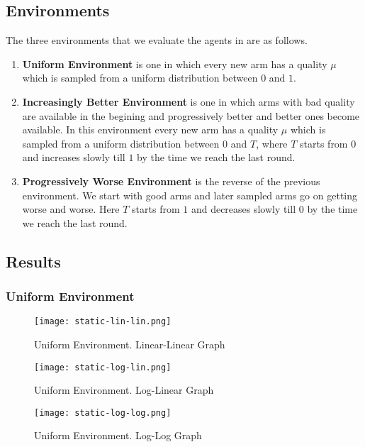 \subsection{Environments}
The three environments that we evaluate the agents in are as follows.

\begin{enumerate}
    \item \textbf{Uniform Environment} is one in which every new arm has a quality $\mu$ which is sampled from a uniform distribution between $0$ and $1$.
    \item \textbf{Increasingly Better Environment} is one in which arms with bad quality are available in the begining and progressively better and better ones become available. In this environment every new arm has a quality $\mu$ which is sampled from a uniform distribution between $0$ and $T$, where $T$ starts from $0$ and increases slowly till $1$ by the time we reach the last round. 
    \item \textbf{Progressively Worse Environment} is the reverse of the previous environment. We start with good arms and later sampled arms go on getting worse and worse. Here $T$ starts from $1$ and decreases slowly till $0$ by the time we reach the last round. 
\end{enumerate}

\subsection{Results}

\subsubsection{Uniform Environment}
\begin{figure}[ht]
    \centering
    \texttt{[image: static-lin-lin.png]}
    \caption{Uniform Environment. Linear-Linear Graph}
    \label{fig:u1}
\end{figure}

\begin{figure}[h!]
    \centering
    \texttt{[image: static-log-lin.png]}
    \caption{Uniform Environment. Log-Linear Graph}
    \label{fig:u2}
\end{figure}

\begin{figure}[h!]
    \centering
    \texttt{[image: static-log-log.png]}
    \caption{Uniform Environment. Log-Log Graph}
    \label{fig:u3}
\end{figure}

